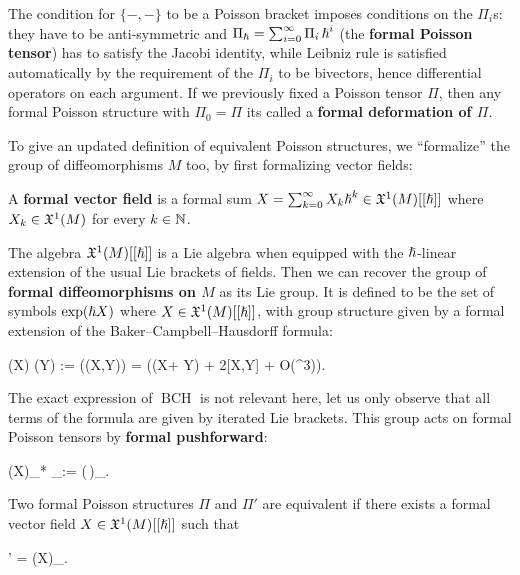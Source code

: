 \begin{remark}
	The condition for $\{-,-\}$ to be a Poisson bracket imposes conditions on the $\Pi_i$s: they have to be anti-symmetric and $\Pi_{\boldsymbol\hslash} = \sum_{i = 0}^\infty \Pi_i\, {\boldsymbol\hslash}^i$ (the \textbf{formal Poisson tensor}) has to satisfy the Jacobi identity, while Leibniz rule is satisfied automatically by the requirement of the $\Pi_i$ to be bivectors, hence differential operators on each argument. If we previously fixed a Poisson tensor $\Pi$, then any formal Poisson structure with $\Pi_0 = \Pi$ its called a \textbf{formal deformation of $\Pi$}.
\end{remark}

To give an updated definition of equivalent Poisson structures, we ``formalize'' the group of diffeomorphisms $M$ too, by first formalizing vector fields:

\begin{definition}
	A \textbf{formal vector field} is a formal sum $X = \sum_{k = 0}^\infty X_k {\boldsymbol\hslash}^k \in \mathfrak{X}^1(M)[[{\boldsymbol\hslash}]]$ where $X_k \in \mathfrak{X}^1(M)$ for every $k \in \mathbb{N}$.
\end{definition}

The algebra $\mathfrak{X}^1(M)[[{\boldsymbol\hslash}]]$ is a Lie algebra when equipped with the ${\boldsymbol\hslash}$-linear extension of the usual Lie brackets of fields. Then we can recover the group of \textbf{formal diffeomorphisms on $M$} as its Lie group. It is defined to be the set of symbols $\operatorname{exp}({\boldsymbol\hslash} X)$ where $X \in \mathfrak{X}^1(M)[[{\boldsymbol\hslash}]]$, with group structure given by a formal extension of the Baker--Campbell--Hausdorff formula:
\begin{eqalign}
	\exp(\planck X) \cdot \exp(\planck Y) := \exp\left(\planck {}(X,Y)\right) = \exp(\planck (X+ Y) + 2[X,Y] + O(\planck^3)).
\end{eqalign}
The exact expression of $\operatorname{BCH}$ is not relevant here, let us only observe that all terms of the formula are given by iterated Lie brackets. This group acts on formal Poisson tensors by \textbf{formal pushforward}:
\begin{eqalign}
	\exp(\planck X)_* \Pi_\planck := \exp(\planck\,)\Pi_\planck.
\end{eqalign}

\begin{definition}
	Two formal Poisson structures $\Pi$ and $\Pi'$ are equivalent if there exists a formal vector field $X \in \mathfrak{X}^1(M)[[{\boldsymbol\hslash}]]$ such that
	\begin{eqalign}
		\Pi' = \exp(\planck X)_\star \Pi.
	\end{eqalign}
\end{definition}

